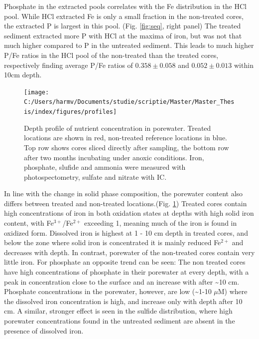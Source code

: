 \documentclass[a4paper,11pt]{article}
\begin{document}
Phosphate in the extracted pools correlates with the Fe distribution in the HCl pool. While HCl extracted Fe is only a small fraction in the non-treated cores, the extracted P is largest in this pool. (Fig. \ref{fig:seq}, right panel) The treated sediment extracted more P with HCl at the maxima of iron, but was not that much higher compared to P in the untreated sediment. This leads to much higher P/Fe ratios in the HCl pool of the non-treated than the treated cores, respectively finding average P/Fe ratios of \(0.358\pm 0.058\) and \(0.052 \pm 0.013\) within 10cm depth.
\begin{figure}

{\centering \texttt{[image: C:/Users/harmv/Documents/studie/scriptie/Master/Master\_Thesis/index/figures/profiles]} 

}

\caption{Depth profile of nutrient concentration in porewater. Treated locations are shown in red, non-treated reference locations in blue. Top row shows cores sliced directly after sampling, the bottom row after two months incubating under anoxic conditions. Iron, phosphate, slufide and ammonia were measured with photospectometry, sulfate and nitrate with IC.}\label{fig:pwprofiles}
\end{figure}
In line with the change in solid phase composition, the porewater content also differs between treated and non-treated locations.(Fig. \ref{fig:pwprofiles}) Treated cores contain high concentrations of iron in both oxidation states at depths with high solid iron content, with Fe\(^{3+}\)/Fe\(^{2+}\) exceeding 1, meaning much of the iron is found in oxidized form. Dissolved iron is highest at 1 - 10 cm depth in treated cores, and below the zone where solid iron is concentrated it is mainly reduced Fe\(^{2+}\) and decreases with depth. In contrast, porewater of the non-treated cores contain very little iron. For phosphate an opposite trend can be seen: The non treated cores have high concentrations of phosphate in their porewater at every depth, with a peak in concentration close to the surface and an increase with after \textasciitilde10 cm. Phosphate concentrations in the porewater, however, are low (\textasciitilde1-10 \(\mu\)M) where the dissolved iron concentration is high, and increase only with depth after 10 cm. A similar, stronger effect is seen in the sulfide distribution, where high porewater concentrations found in the untreated sediment are absent in the presence of dissolved iron.
\end{document}
